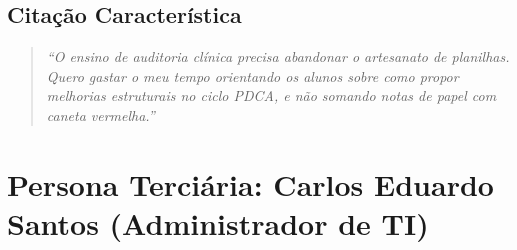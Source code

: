 \subsection{Citação Característica}
\begin{quote}
\textit{``O ensino de auditoria clínica precisa abandonar o artesanato de planilhas. Quero gastar o meu tempo orientando os alunos sobre como propor melhorias estruturais no ciclo PDCA, e não somando notas de papel com caneta vermelha.''}
\end{quote}

\section{Persona Terciária: Carlos Eduardo Santos (Administrador de TI)}
\label{sec_persona_carlos}

